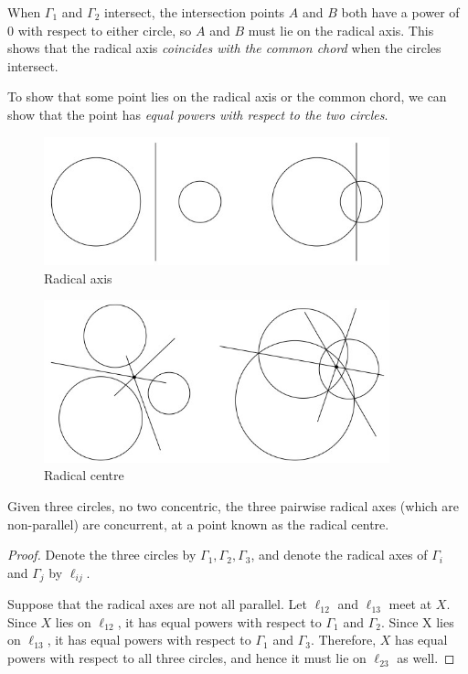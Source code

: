 When $\Gamma_1$ and $\Gamma_2$ intersect, the intersection points $A$ and $B$ both have a power of $0$ with respect to either circle, so $A$ and $B$ must lie on the radical axis. This shows that the radical axis \emph{coincides with the common chord} when the circles intersect.

To show that some point lies on the radical axis or the common chord, we can show that the point has \emph{equal powers with respect to the two circles}.

\begin{figure}[H]
    \centering
    \includegraphics[width=10cm]{images/Radical_axis.jpg}
    \caption{Radical axis}
\end{figure}

\begin{figure}[H]
    \centering
    \includegraphics[width=10cm]{images/Radical_center.jpg}
    \caption{Radical centre}
\end{figure}

\begin{theorem}
Given three circles, no two concentric, the three pairwise radical axes (which are non-parallel) are concurrent, at a point known as the radical centre.
\end{theorem}

\begin{proof}
Denote the three circles by $\Gamma_1, \Gamma_2, \Gamma_3$, and denote the radical axes of $\Gamma_i$ and $\Gamma_j$ by $\ell_{ij}$.

Suppose that the radical axes are not all parallel. Let $\ell_{12}$ and $\ell_{13}$ meet at $X$. Since $X$ lies on $\ell_{12}$, it has equal powers with respect to $\Gamma_1$ and $\Gamma_2$. Since X lies on $\ell_{13}$, it has equal powers with respect to $\Gamma_1$ and $\Gamma_3$. Therefore, $X$ has equal powers with respect to all three circles, and hence it must lie on $\ell_{23}$ as well.
\end{proof}

